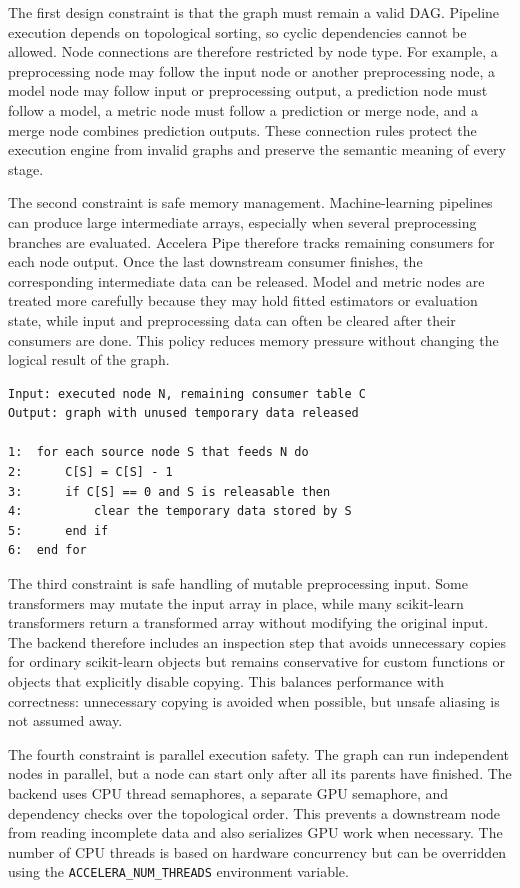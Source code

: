 The first design constraint is that the graph must remain a valid DAG. Pipeline
execution depends on topological sorting, so cyclic dependencies cannot be
allowed. Node connections are therefore restricted by node type. For example, a
preprocessing node may follow the input node or another preprocessing node, a
model node may follow input or preprocessing output, a prediction node must
follow a model, a metric node must follow a prediction or merge node, and a merge
node combines prediction outputs. These connection rules protect the execution
engine from invalid graphs and preserve the semantic meaning of every stage.

The second constraint is safe memory management. Machine-learning pipelines can
produce large intermediate arrays, especially when several preprocessing
branches are evaluated. Accelera Pipe therefore tracks remaining consumers for
each node output. Once the last downstream consumer finishes, the corresponding
intermediate data can be released. Model and metric nodes are treated more
carefully because they may hold fitted estimators or evaluation state, while
input and preprocessing data can often be cleared after their consumers are
done. This policy reduces memory pressure without changing the logical result of
the graph.

\begin{lstlisting}[style=algostyle,caption={Consumer-count based intermediate release}]
Input: executed node N, remaining consumer table C
Output: graph with unused temporary data released

1:  for each source node S that feeds N do
2:      C[S] = C[S] - 1
3:      if C[S] == 0 and S is releasable then
4:          clear the temporary data stored by S
5:      end if
6:  end for
\end{lstlisting}

The third constraint is safe handling of mutable preprocessing input. Some
transformers may mutate the input array in place, while many scikit-learn
transformers return a transformed array without modifying the original input.
The backend therefore includes an inspection step that avoids unnecessary copies
for ordinary scikit-learn objects but remains conservative for custom functions
or objects that explicitly disable copying. This balances performance with
correctness: unnecessary copying is avoided when possible, but unsafe aliasing is
not assumed away.

The fourth constraint is parallel execution safety. The graph can run independent
nodes in parallel, but a node can start only after all its parents have finished.
The backend uses CPU thread semaphores, a separate GPU semaphore, and dependency
checks over the topological order. This prevents a downstream node from reading
incomplete data and also serializes GPU work when necessary. The number of CPU
threads is based on hardware concurrency but can be overridden using the
\texttt{ACCELERA\_NUM\_THREADS} environment variable.

